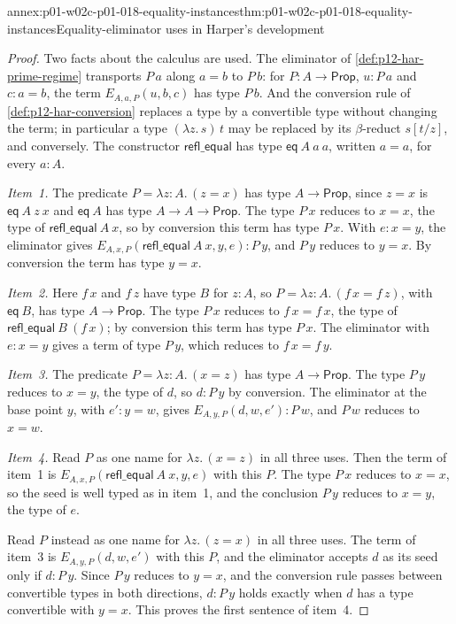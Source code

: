 \begin{annexitem}{annex:p01-w02c-p01-018-equality-instances}{thm:p01-w02c-p01-018-equality-instances}{Equality-eliminator uses in Harper's development}
\begin{proof}
Two facts about the calculus are used.  The eliminator of
\cref{def:p12-har-prime-regime} transports \(P\,a\) along \(a=b\) to
\(P\,b\): for \(P:A\to\mathsf{Prop}\), \(u:P\,a\) and \(c:a=b\), the term
\(E_{A,a,P}(u,b,c)\) has type \(P\,b\).  And the conversion rule of
\cref{def:p12-har-conversion} replaces a type by a convertible type
without changing the term; in particular a type \((\lambda z.\,s)\,t\)
may be replaced by its \(\beta\)-reduct \(s[t/z]\), and conversely.  The
constructor \(\mathsf{refl\_equal}\) has type \(\mathsf{eq}\ A\ a\ a\),
written \(a=a\), for every \(a:A\).

\emph{Item~1.}  The predicate \(P=\lambda z{:}A.\,(z=x)\) has type
\(A\to\mathsf{Prop}\), since \(z=x\) is \(\mathsf{eq}\ A\ z\ x\) and
\(\mathsf{eq}\ A\) has type \(A\to A\to\mathsf{Prop}\).  The type \(P\,x\)
reduces to \(x=x\), the type of \(\mathsf{refl\_equal}\ A\ x\), so by
conversion this term has type \(P\,x\).  With \(e:x=y\), the eliminator
gives \(E_{A,x,P}(\mathsf{refl\_equal}\ A\ x,y,e):P\,y\), and \(P\,y\)
reduces to \(y=x\).  By conversion the term has type \(y=x\).

\emph{Item~2.}  Here \(f\,x\) and \(f\,z\) have type \(B\) for \(z:A\), so
\(P=\lambda z{:}A.\,(f\,x=f\,z)\), with \(\mathsf{eq}\ B\), has type
\(A\to\mathsf{Prop}\).  The type \(P\,x\) reduces to \(f\,x=f\,x\), the
type of \(\mathsf{refl\_equal}\ B\ (f\,x)\); by conversion this term has
type \(P\,x\).  The eliminator with \(e:x=y\) gives a term of type
\(P\,y\), which reduces to \(f\,x=f\,y\).

\emph{Item~3.}  The predicate \(P=\lambda z{:}A.\,(x=z)\) has type
\(A\to\mathsf{Prop}\).  The type \(P\,y\) reduces to \(x=y\), the type of
\(d\), so \(d:P\,y\) by conversion.  The eliminator at the base point
\(y\), with \(e':y=w\), gives \(E_{A,y,P}(d,w,e'):P\,w\), and \(P\,w\)
reduces to \(x=w\).

\emph{Item~4.}  Read \(P\) as one name for \(\lambda z.\,(x=z)\) in all
three uses.  Then the term of item~1 is
\(E_{A,x,P}(\mathsf{refl\_equal}\ A\ x,y,e)\) with this \(P\).  The type
\(P\,x\) reduces to \(x=x\), so the seed is well typed as in item~1, and
the conclusion \(P\,y\) reduces to \(x=y\), the type of \(e\).

Read \(P\) instead as one name for \(\lambda z.\,(z=x)\) in all three uses.
The term of item~3 is \(E_{A,y,P}(d,w,e')\) with this \(P\), and the
eliminator accepts \(d\) as its seed only if \(d:P\,y\).  Since \(P\,y\)
reduces to \(y=x\), and the conversion rule passes between convertible
types in both directions, \(d:P\,y\) holds exactly when \(d\) has a type
convertible with \(y=x\).  This proves the first sentence of item~4.


\end{proof}
\end{annexitem}
